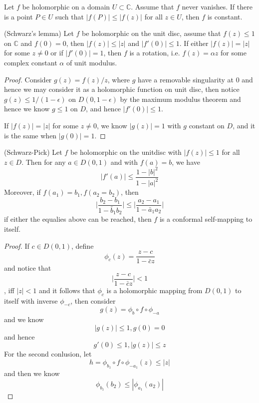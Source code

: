 \documentclass[lang=en, color=blue, ]{elegantbook}
\newcommand{\C}{\mathbb{C}}
\begin{document}
\begin{proposition}
    Let $f$ be holomorphic on a domain $U\subset\C$. Assume that $f$ never vanishes. If there is a point $P\in U$ such that $|f(P)| \leq |f(z)|$ for all $z\in U$, then $f$ is constant. 
\end{proposition}

\begin{proposition}
    (Schwarz's lemma) Let $f$ be holomorphic on the unit disc, assume that $f(z) \leq 1$ on $\C$ and $f(0) = 0$, then $|f(z)| \leq |z|$ and $|f'(0)| \leq 1$.
    If either $|f(z)|=|z|$ for some $z\neq 0$ or if $|f'(0)| = 1$, then $f$ is a rotation, i.e. $f(z) = \alpha z$ for some complex constant $\alpha$ of unit modulus.
\end{proposition}
\begin{proof}
    Consider $g(z) = f(z)/z$, where $g$ have a removable singularity at $0$ and hence we may consider it as a holomorphic function on unit disc, then notice $g(z) \leq 1/(1-\epsilon)$ on $D(0,1-\epsilon)$ by the maximum modulus theorem and hence we know $g\leq 1$ on $D$, and hence $|f'(0)| \leq 1$.\par
    If $|f(z)| = |z|$ for some $z\neq 0$, we know $|g(z)| = 1$ with $g$ constant on $D$, and it is the same when $|g(0)| = 1$.
\end{proof}

\begin{theorem}
    (Schwarz-Pick) Let $f$ be holomorphic on the unitdisc with $|f(z)| \leq 1$ for all $z\in D$. Then for any $a\in D(0,1)$ and with $f(a) = b$, we have
    \[|f'(a)| \leq \dfrac{1-|b|^2}{1-|a|^2}\]
    Moreover, if $f(a_1)= b_1,f(a_2 = b_2)$, then
    \[\Big|\dfrac{b_2-b_1}{1-\bar{b}_1b_2}\Big| \leq \Big|\dfrac{a_2-a_1}{1-\bar{a}_1a_2}\Big|\]
    if either the equalies above can be reached, then $f$ is a conformal self-mapping to itself.
\end{theorem}
\begin{proof}
    If $c\in D(0,1)$, define
    \[\phi_c(z) = \dfrac{z-c}{1-\bar{c}z}\]
    and notice that
    \[\Big|\dfrac{z-c}{1-\bar{c}z}\Big| < 1\], iff $|z|<1$ and it follows that $\phi_c$ is a holomorphic mapping from $D(0,1)$ to itself with inverse $\phi_{-c}$, then consider
    \[g(z) = \phi_b\circ f \circ \phi_{-a}\]
    and we know
    \[|g(z)| \leq 1, g(0)=0\]
    and hence
    \[g'(0) \leq 1, |g(z)| \leq z\]
    For the second conlusion, let
    \[h = \phi_{b_1}\circ f\circ\phi_{-a_1}(z) \leq |z|\]
    and then we know
    \[\phi_{b_1}(b_2) \leq |\phi_{a_1}(a_2)|\]
\end{proof}
\end{document}

